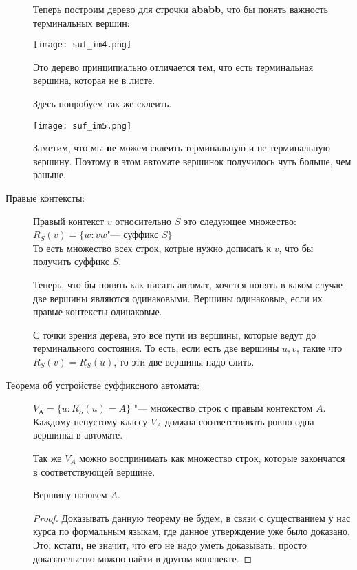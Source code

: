 \begin{description}
    Теперь построим дерево для строчки \textbf{ababb}, что бы понять важность терминальных вершин:
    
    \texttt{[image: suf\_im4.png]}


    Это дерево принципиально отличается тем, что есть терминальная вершина, которая не в листе.

    Здесь попробуем так же склеить.
    
    \texttt{[image: suf\_im5.png]}

    Заметим, что мы \textbf{не} можем склеить терминальную и не терминальную вершину. Поэтому в этом 
    автомате вершинок получилось чуть больше, чем раньше. 
    
    \item[Правые контексты:]
    \begin{Def}
    Правый контекст $v$ относительно $S$ это следующее множество:\\
    $R_S(v) = \{w: vw $"--- суффикс $S\}$ \\
    То есть множество всех строк,  котрые нужно дописать к $v$, что бы  получить суффикс $S$.
    \end{Def}

    Теперь, что бы понять как писать автомат, хочется понять в каком случае две вершины являются одинаковыми. 
    Вершины одинаковые, если их правые контексты одинаковые. 

    С точки зрения дерева, это все пути из вершины, которые ведут до терминального состояния. То есть, 
    если есть две вершины $u, v$, такие что $R_S(v) = R_S(u)$, то эти две вершины надо слить.
    
    \item[Теорема об устройстве суффиксного автомата:]
    \begin{theorem}
    $V_А = \{u \colon R_S(u) = A\}$ "--- множество строк с правым контекстом $A$.\\
    Каждому непустому классу $V_A$ должна соответствовать ровно одна вершинка в автомате. 
    \end{theorem}

    Так же $V_A$ можно воспринимать как множество строк, которые закончатся в соответствующей вершине. 
    
    Вершину назовем $A$.

    \begin{proof}
    Доказывать данную теорему не будем, 
    в связи с существанием у нас курса по формальным языкам, где 
    данное утверждение уже было доказано. Это, кстати, не значит, что его
    не надо уметь доказывать, просто доказательство можно найти в другом конспекте. 
    \end{proof}


\end{description}

